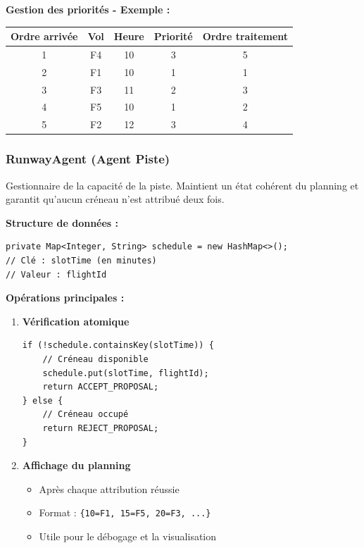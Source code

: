 \documentclass[12pt,a4paper]{article}
\begin{document}
\textbf{Gestion des priorités - Exemple :}

\begin{center}
\begin{tabular}{|c|c|c|c|c|}
\hline
\rowcolor{lightblue!30}
\textbf{Ordre arrivée} & \textbf{Vol} & \textbf{Heure} & \textbf{Priorité} & \textbf{Ordre traitement} \\
\hline
1 & F4 & 10 & 3 & 5 \\
\hline
2 & F1 & 10 & 1 & 1 \\
\hline
3 & F3 & 11 & 2 & 3 \\
\hline
4 & F5 & 10 & 1 & 2 \\
\hline
5 & F2 & 12 & 3 & 4 \\
\hline
\end{tabular}
\end{center}

\subsubsection{RunwayAgent (Agent Piste)}

\begin{tcolorbox}[colback=lightblue!15, colframe=primaryblue, title=\textbf{Rôle et Responsabilités}]
Gestionnaire de la capacité de la piste. Maintient un état cohérent du planning et garantit qu'aucun créneau n'est attribué deux fois.
\end{tcolorbox}

\textbf{Structure de données :}

\begin{lstlisting}[caption=Planning de la piste]
private Map<Integer, String> schedule = new HashMap<>();
// Clé : slotTime (en minutes)
// Valeur : flightId
\end{lstlisting}

\textbf{Opérations principales :}

\begin{enumerate}[leftmargin=*]
    \item \textbf{Vérification atomique}
    \begin{lstlisting}
if (!schedule.containsKey(slotTime)) {
    // Créneau disponible
    schedule.put(slotTime, flightId);
    return ACCEPT_PROPOSAL;
} else {
    // Créneau occupé
    return REJECT_PROPOSAL;
}
    \end{lstlisting}

    \item \textbf{Affichage du planning}
    \begin{itemize}
        \item Après chaque attribution réussie
        \item Format : \texttt{\{10=F1, 15=F5, 20=F3, ...\}}
        \item Utile pour le débogage et la visualisation
    \end{itemize}
\end{enumerate}
\end{document}
